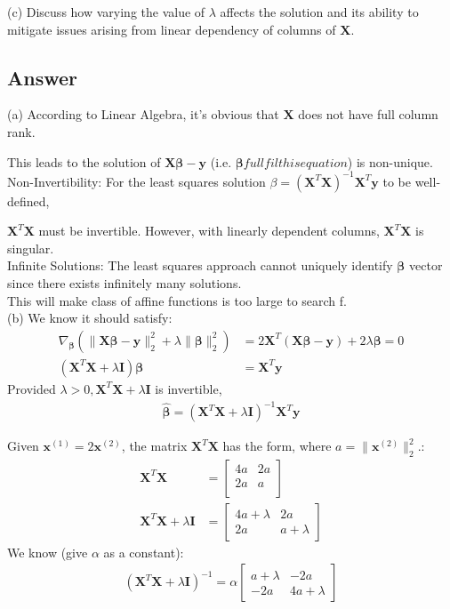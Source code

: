 \documentclass[a4paper,12pt]{article}
\begin{document}
(c) Discuss how varying the value of \(\lambda\) affects the solution and its ability to mitigate issues arising from linear dependency of columns of \(\bm{X}\).

\subsection*{Answer}
(a) According to Linear Algebra, it's obvious that \(\bm{X}\) does not have full column rank.

This leads to the solution of \(\bm{X}\bm{\beta} - \bm{y}\) (i.e. \(\bm{\beta} fullfil this equation\)) is non-unique. \\

Non-Invertibility: For the least squares solution \(\beta = (\bm{X}^T\bm{X})^{-1}\bm{X}^{T}\bm{y}\) to be well-defined, 

\(\bm{X}^T\bm{X}\) must be invertible. However, with linearly dependent columns, \(\bm{X}^T\bm{X}\) is singular. \\

Infinite Solutions: The least squares approach cannot uniquely identify \(\bm{\beta}\) vector since there exists infinitely many solutions. \\

This will make class of affine functions is too large to search f. \\
(b)
We know it should satisfy:
\begin{align*}
    \nabla_{\bm{\beta}}(\|\bm{X}\bm{\beta} - \bm{y}\|_2^2 + \lambda \|\bm{\beta}\|_2^2) &= 2\bm{X}^T(\bm{X}\bm{\beta} - \bm{y}) + 2\lambda\bm{\beta} = 0  \\
    (\bm{X}^T\bm{X} + \lambda \bm{I})\bm{\beta} &= \bm{X}^T\bm{y}
\end{align*}
Provided \(\lambda > 0, \bm{X}^T \bm{X} + \lambda\bm{I}\) is invertible,
\begin{align*}
    \hat{\bm{\beta}} = (\bm{X}^T\bm{X} + \lambda \bm{I})^{-1}\bm{X}^T\bm{y}
\end{align*}

Given \(\bm{x}^{(1)} = 2\bm{x}^{(2)}\), the matrix \(\bm{X}^T\bm{X}\) has the form, where \(a = \|\bm{x}^{(2)}\|_2^2\).:
\begin{align*}
    \bm{X}^T\bm{X} &= \begin{bmatrix}
        4a &2a \\
        2a &a \\
    \end{bmatrix} \\
    \bm{X}^T\bm{X} + \lambda\bm{I} &= \begin{bmatrix}
        4a+\lambda &2a  \\
        2a &a+\lambda
    \end{bmatrix}
\end{align*}
We know (give \(\alpha\) as a constant):
\begin{align*}
    (\bm{X}^T\bm{X} + \lambda\bm{I})^{-1} = \alpha \begin{bmatrix}
        a + \lambda &-2a \\
        -2a          &4a+\lambda
    \end{bmatrix}
\end{align*}
\end{document}
